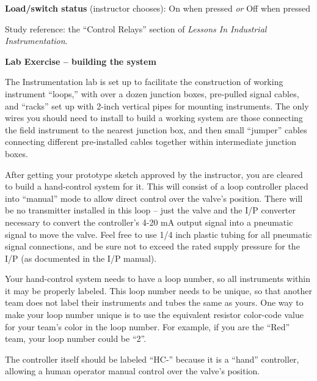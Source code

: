 \begin{itemize}
\vskip 20pt

\noindent
{\bf Load/switch status} (instructor chooses): \hskip 20pt \underbar{\hskip 20pt} On when pressed \hskip 10pt {\it or} \hskip 10pt \underbar{\hskip 20pt} Off when pressed

\vfil

Study reference: the ``Control Relays'' section of {\it Lessons In Industrial Instrumentation}.







\vfil \eject

\noindent
{\bf Lab Exercise -- building the system}

\vskip 5pt

The Instrumentation lab is set up to facilitate the construction of working instrument ``loops,'' with over a dozen junction boxes, pre-pulled signal cables, and ``racks'' set up with 2-inch vertical pipes for mounting instruments.  The only wires you should need to install to build a working system are those connecting the field instrument to the nearest junction box, and then small ``jumper'' cables connecting different pre-installed cables together within intermediate junction boxes.

After getting your prototype sketch approved by the instructor, you are cleared to build a hand-control system for it.  This will consist of a loop controller placed into ``manual'' mode to allow direct control over the valve's position.  There will be no transmitter installed in this loop -- just the valve and the I/P converter necessary to convert the controller's 4-20 mA output signal into a pneumatic signal to move the valve.  Feel free to use 1/4 inch plastic tubing for all pneumatic signal connections, and be sure not to exceed the rated supply pressure for the I/P (as documented in the I/P manual).

Your hand-control system needs to have a loop number, so all instruments within it may be properly labeled.  This loop number needs to be unique, so that another team does not label their instruments and tubes the same as yours.  One way to make your loop number unique is to use the equivalent resistor color-code value for your team's color in the loop number.  For example, if you are the ``Red'' team, your loop number could be ``2''. 

The controller itself should be labeled ``HC-'' because it is a ``hand'' controller, allowing a human operator manual control over the valve's position.


\end{itemize}
